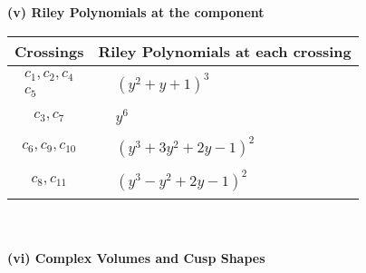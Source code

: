 \documentclass[1p]{elsarticle_modified}
\theoremstyle{definition}
\begin{document}
\newpage\renewcommand{\arraystretch}{1}
\flushleft \textbf{(v) Riley Polynomials at the component}\newline \\
\begin{tabular}{m{50pt}|m{274pt}}
Crossings & \hspace{64pt}Riley Polynomials at each crossing \\
\hline $$\begin{aligned}c_{1},c_{2},c_{4}\\c_{5}\end{aligned}$$&$\begin{aligned}
&(y^2+y+1)^3
\end{aligned}$\\
\hline $$\begin{aligned}c_{3},c_{7}\end{aligned}$$&$\begin{aligned}
&y^6
\end{aligned}$\\
\hline $$\begin{aligned}c_{6},c_{9},c_{10}\end{aligned}$$&$\begin{aligned}
&(y^3+3 y^2+2 y-1)^2
\end{aligned}$\\
\hline $$\begin{aligned}c_{8},c_{11}\end{aligned}$$&$\begin{aligned}
&(y^3- y^2+2 y-1)^2
\end{aligned}$\\
\hline
\end{tabular}\\~\\
\newpage\flushleft \textbf{(vi) Complex Volumes and Cusp Shapes}
\end{document}
